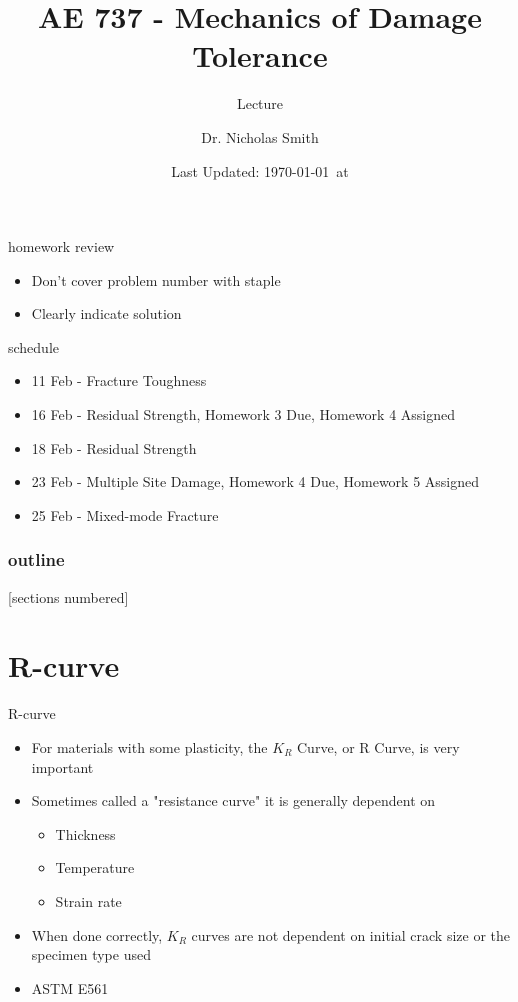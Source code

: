 \documentclass[10pt]{beamer}
\title{AE 737 - Mechanics of Damage Tolerance}
\subtitle{Lecture \arabic{lecture}}
\date{Last Updated: \today\ at \DTMcurrenttime}
\author{Dr. Nicholas Smith}
\institute{Wichita State University, Department of Aerospace Engineering}
\begin{document}
\maketitle

\begin{frame}{homework review}
	\begin{itemize}
		\item Don't cover problem number with staple
		\item Clearly indicate solution
	\end{itemize}
\end{frame}

\begin{frame}{schedule}
	\begin{itemize}
		\item 11 Feb - Fracture Toughness
		\item 16 Feb - Residual Strength, Homework 3 Due, Homework 4 Assigned
		\item 18 Feb - Residual Strength
		\item 23 Feb - Multiple Site Damage, Homework 4 Due, Homework 5 Assigned
		\item 25 Feb - Mixed-mode Fracture
	\end{itemize}
\end{frame}

\begin{frame}
  \frametitle{outline}
  [sections numbered]
  \tableofcontents[hideallsubsections]
\end{frame}

\section{R-curve}

\begin{frame}{R-curve}
	\begin{itemize}[<+->]
		\item For materials with some plasticity, the $K_R$ Curve, or R Curve, is very important
		\item Sometimes called a "resistance curve" it is generally dependent on
		\begin{itemize}[<+->]
			\item Thickness
			\item Temperature
			\item Strain rate
		\end{itemize}
		\item When done correctly, $K_R$ curves are not dependent on initial crack size or the specimen type used
		\item ASTM E561
	\end{itemize}
\end{frame}
\end{document}
